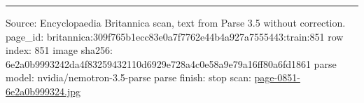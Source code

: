 \documentclass[10pt]{article}
\begin{document}
\vfill\par\noindent\rule{\linewidth}{0.4pt}\par
{\scriptsize\color{gray}\noindent Source: Encyclopaedia Britannica scan, text from Parse 3.5 without correction. page\_id: britannica:309f765b1ecc83e0a7f7762e44b4a927a7555443:train:851 \quad row index: 851 \quad image sha256: 6e2a0b9993242da4f83259432110d6929e728a4c0e58a9e79a16ff80a6fd1861 \quad parse model: nvidia/nemotron-3.5-parse \quad parse finish: stop \quad scan: \href{../scans/page-0851-6e2a0b999324.jpg}{page-0851-6e2a0b999324.jpg}\par}
\end{document}
